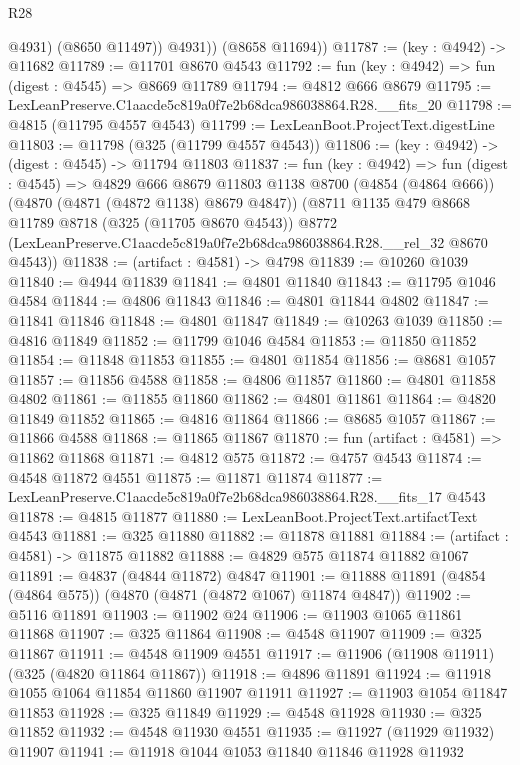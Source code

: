 \begin{lexlean}{R28}
\begin{coremodule}
              @4931)
            (@8650 @11497))
          @4931))
      (@8658 @11694))
@11787 := (key : @4942) -> @11682
@11789 := @11701 @8670 @4543
@11792 := fun (key : @4942) => fun (digest : @4545) => @8669 @11789
@11794 := @4812 @666 @8679
@11795 := LexLeanPreserve.C1aacde5c819a0f7e2b68dca986038864.R28.__fits_20
@11798 := @4815 (@11795 @4557 @4543)
@11799 := LexLeanBoot.ProjectText.digestLine
@11803 := @11798 (@325 (@11799 @4557 @4543))
@11806 := (key : @4942) -> (digest : @4545) -> @11794 @11803
@11837 := fun (key : @4942) =>
  fun (digest : @4545) =>
  @4829
    @666
    @8679
    @11803
    @1138
    @8700
    (@4854 (@4864 @666))
    (@4870 (@4871 (@4872 @1138) @8679 @4847))
    (@8711
      @1135
      @479
      @8668
      @11789
      @8718
      (@325 (@11705 @8670 @4543))
      @8772
      (LexLeanPreserve.C1aacde5c819a0f7e2b68dca986038864.R28.__rel_32 @8670 @4543))
@11838 := (artifact : @4581) -> @4798
@11839 := @10260 @1039
@11840 := @4944 @11839
@11841 := @4801 @11840
@11843 := @11795 @1046 @4584
@11844 := @4806 @11843
@11846 := @4801 @11844 @4802
@11847 := @11841 @11846
@11848 := @4801 @11847
@11849 := @10263 @1039
@11850 := @4816 @11849
@11852 := @11799 @1046 @4584
@11853 := @11850 @11852
@11854 := @11848 @11853
@11855 := @4801 @11854
@11856 := @8681 @1057
@11857 := @11856 @4588
@11858 := @4806 @11857
@11860 := @4801 @11858 @4802
@11861 := @11855 @11860
@11862 := @4801 @11861
@11864 := @4820 @11849 @11852
@11865 := @4816 @11864
@11866 := @8685 @1057
@11867 := @11866 @4588
@11868 := @11865 @11867
@11870 := fun (artifact : @4581) => @11862 @11868
@11871 := @4812 @575
@11872 := @4757 @4543
@11874 := @4548 @11872 @4551
@11875 := @11871 @11874
@11877 := LexLeanPreserve.C1aacde5c819a0f7e2b68dca986038864.R28.__fits_17 @4543
@11878 := @4815 @11877
@11880 := LexLeanBoot.ProjectText.artifactText @4543
@11881 := @325 @11880
@11882 := @11878 @11881
@11884 := (artifact : @4581) -> @11875 @11882
@11888 := @4829 @575 @11874 @11882 @1067
@11891 := @4837 (@4844 @11872) @4847
@11901 := @11888 @11891 (@4854 (@4864 @575)) (@4870 (@4871 (@4872 @1067) @11874 @4847))
@11902 := @5116 @11891
@11903 := @11902 @24
@11906 := @11903 @1065 @11861 @11868
@11907 := @325 @11864
@11908 := @4548 @11907
@11909 := @325 @11867
@11911 := @4548 @11909 @4551
@11917 := @11906 (@11908 @11911) (@325 (@4820 @11864 @11867))
@11918 := @4896 @11891
@11924 := @11918 @1055 @1064 @11854 @11860 @11907 @11911
@11927 := @11903 @1054 @11847 @11853
@11928 := @325 @11849
@11929 := @4548 @11928
@11930 := @325 @11852
@11932 := @4548 @11930 @4551
@11935 := @11927 (@11929 @11932) @11907
@11941 := @11918 @1044 @1053 @11840 @11846 @11928 @11932

\end{coremodule}
\end{lexlean}
